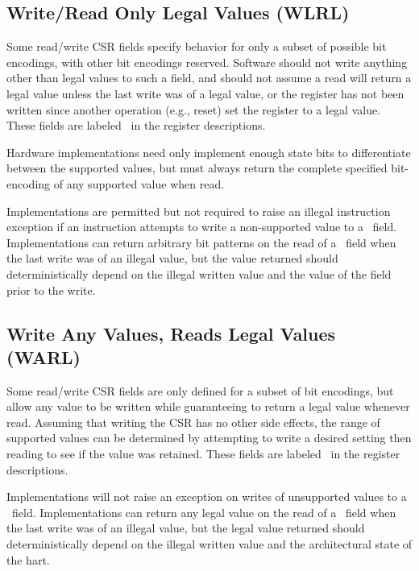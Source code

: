 \subsection*{Write/Read Only Legal Values (WLRL)}

Some read/write CSR fields specify behavior for only a subset of
possible bit encodings, with other bit encodings reserved.  Software
should not write anything other than legal values to such a field, and
should not assume a read will return a legal value unless the last
write was of a legal value, or the register has not been written since
another operation (e.g., reset) set the register to a legal value.
These fields are labeled \wlrl\ in the register descriptions.

\begin{commentary}
Hardware implementations need only implement enough state bits to
differentiate between the supported values, but must always return the
complete specified bit-encoding of any supported value when read.
\end{commentary}

Implementations are permitted but not required to raise an illegal
instruction exception if an instruction attempts to write a
non-supported value to a \wlrl\ field.  Implementations can
return arbitrary bit patterns on the read of a \wlrl\ field when the last
write was of an illegal value, but the value returned should
deterministically depend on the illegal written value and
the value of the field prior to the write.

\subsection*{Write Any Values, Reads Legal Values (WARL)}

Some read/write CSR fields are only defined for a subset of bit
encodings, but allow any value to be written while guaranteeing to
return a legal value whenever read.  Assuming that writing the CSR has
no other side effects, the range of supported values can be determined
by attempting to write a desired setting then reading to see if the
value was retained.  These fields are labeled \warl\ in the register
descriptions.

Implementations will not raise an exception on writes of unsupported
values to a \warl\ field.  Implementations can
return any legal value on the read of a \warl\ field when the last
write was of an illegal value, but the legal value returned should
deterministically depend on the illegal written value and
the architectural state of the hart.

